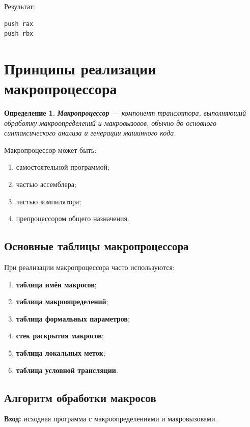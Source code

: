 \documentclass[12pt,a4paper]{article}
\newtheorem{definition}{Определение}
\begin{document}
Результат:

\begin{lstlisting}
push rax
push rbx
\end{lstlisting}

\section{Принципы реализации макропроцессора}

\begin{definition}
\textbf{Макропроцессор} --- компонент транслятора, выполняющий обработку макроопределений и макровызовов, обычно до основного синтаксического анализа и генерации машинного кода.
\end{definition}

Макропроцессор может быть:

\begin{enumerate}
    \item самостоятельной программой;
    \item частью ассемблера;
    \item частью компилятора;
    \item препроцессором общего назначения.
\end{enumerate}

\subsection{Основные таблицы макропроцессора}

При реализации макропроцессора часто используются:

\begin{enumerate}
    \item \textbf{таблица имён макросов};
    \item \textbf{таблица макроопределений};
    \item \textbf{таблица формальных параметров};
    \item \textbf{стек раскрытия макросов};
    \item \textbf{таблица локальных меток};
    \item \textbf{таблица условной трансляции}.
\end{enumerate}

\subsection{Алгоритм обработки макросов}

\textbf{Вход:} исходная программа с макроопределениями и макровызовами.
\end{document}
